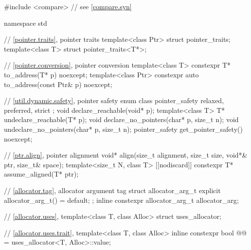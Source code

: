 \begin{codeblock}
#include <compare>              // see \ref{compare.syn}

namespace std {
  // \ref{pointer.traits}, pointer traits
  template<class Ptr> struct pointer_traits;
  template<class T> struct pointer_traits<T*>;

  // \ref{pointer.conversion}, pointer conversion
  template<class T>
    constexpr T* to_address(T* p) noexcept;
  template<class Ptr>
    constexpr auto to_address(const Ptr& p) noexcept;

  // \ref{util.dynamic.safety}, pointer safety
  enum class pointer_safety { relaxed, preferred, strict };
  void declare_reachable(void* p);
  template<class T>
    T* undeclare_reachable(T* p);
  void declare_no_pointers(char* p, size_t n);
  void undeclare_no_pointers(char* p, size_t n);
  pointer_safety get_pointer_safety() noexcept;

  // \ref{ptr.align}, pointer alignment
  void* align(size_t alignment, size_t size, void*& ptr, size_t& space);
  template<size_t N, class T>
    [[nodiscard]] constexpr T* assume_aligned(T* ptr);

  // \ref{allocator.tag}, allocator argument tag
  struct allocator_arg_t { explicit allocator_arg_t() = default; };
  inline constexpr allocator_arg_t allocator_arg{};

  // \ref{allocator.uses}, 
  template<class T, class Alloc> struct uses_allocator;

  // \ref{allocator.uses.trait}, 
  template<class T, class Alloc>
    inline constexpr bool @@ = uses_allocator<T, Alloc>::value;

}
\end{codeblock}
